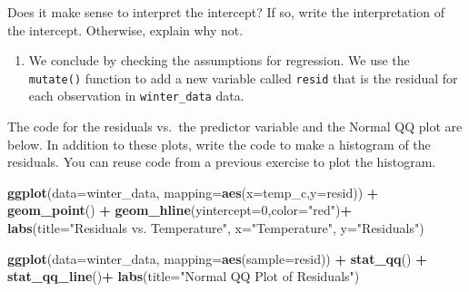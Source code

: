 \documentclass[]{book}
\newenvironment{Shaded}{\begin{snugshade}}{\end{snugshade}}
\newcommand{\KeywordTok}[1]{\textcolor[rgb]{0.13,0.29,0.53}{\textbf{#1}}}
\newcommand{\DataTypeTok}[1]{\textcolor[rgb]{0.13,0.29,0.53}{#1}}
\newcommand{\DecValTok}[1]{\textcolor[rgb]{0.00,0.00,0.81}{#1}}
\newcommand{\StringTok}[1]{\textcolor[rgb]{0.31,0.60,0.02}{#1}}
\newcommand{\OperatorTok}[1]{\textcolor[rgb]{0.81,0.36,0.00}{\textbf{#1}}}
\newcommand{\NormalTok}[1]{#1}
\providecommand{\tightlist}{%
  \setlength{\itemsep}{0pt}\setlength{\parskip}{0pt}}
\begin{document}
Does it make sense to interpret the intercept? If so, write the
interpretation of the intercept. Otherwise, explain why not.

\begin{enumerate}
\def\labelenumi{\arabic{enumi}.}
\setcounter{enumi}{9}
\tightlist
\item
  We conclude by checking the assumptions for regression. We use the
  \texttt{mutate()} function to add a new variable called \texttt{resid}
  that is the residual for each observation in \texttt{winter\_data}
  data.
\end{enumerate}

\begin{Shaded}
\end{Shaded}

The code for the residuals vs.~the predictor variable and the Normal QQ
plot are below. In addition to these plots, write the code to make a
histogram of the residuals. You can reuse code from a previous exercise
to plot the histogram.

\begin{Shaded}
\begin{Highlighting}[]
\KeywordTok{ggplot}\NormalTok{(}\DataTypeTok{data=}\NormalTok{winter_data, }\DataTypeTok{mapping=}\KeywordTok{aes}\NormalTok{(}\DataTypeTok{x=}\NormalTok{temp_c,}\DataTypeTok{y=}\NormalTok{resid)) }\OperatorTok{+}
\StringTok{  }\KeywordTok{geom_point}\NormalTok{() }\OperatorTok{+}\StringTok{ }
\StringTok{  }\KeywordTok{geom_hline}\NormalTok{(}\DataTypeTok{yintercept=}\DecValTok{0}\NormalTok{,}\DataTypeTok{color=}\StringTok{"red"}\NormalTok{)}\OperatorTok{+}
\StringTok{  }\KeywordTok{labs}\NormalTok{(}\DataTypeTok{title=}\StringTok{"Residuals vs. Temperature"}\NormalTok{,}
       \DataTypeTok{x=}\StringTok{"Temperature"}\NormalTok{, }
       \DataTypeTok{y=}\StringTok{"Residuals"}\NormalTok{)}
\end{Highlighting}
\end{Shaded}

\begin{Shaded}
\begin{Highlighting}[]
\KeywordTok{ggplot}\NormalTok{(}\DataTypeTok{data=}\NormalTok{winter_data, }\DataTypeTok{mapping=}\KeywordTok{aes}\NormalTok{(}\DataTypeTok{sample=}\NormalTok{resid)) }\OperatorTok{+}
\StringTok{  }\KeywordTok{stat_qq}\NormalTok{() }\OperatorTok{+}\StringTok{ }
\StringTok{  }\KeywordTok{stat_qq_line}\NormalTok{()}\OperatorTok{+}
\StringTok{  }\KeywordTok{labs}\NormalTok{(}\DataTypeTok{title=}\StringTok{"Normal QQ Plot of Residuals"}\NormalTok{)}
\end{Highlighting}
\end{Shaded}
\end{document}
